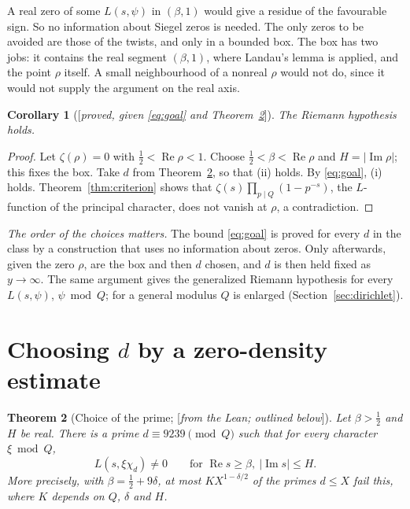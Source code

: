 \documentclass[11pt]{amsart}
\numberwithin{equation}{section}
\newtheorem{theorem}{Theorem}[section]
\newtheorem{corollary}[theorem]{Corollary}
\theoremstyle{definition}
\theoremstyle{remark}
\newcommand{\re}{\operatorname{Re}}
\newcommand{\im}{\operatorname{Im}}
\newcommand{\status}[1]{\textup{[\emph{#1}]}}
\begin{document}
A real zero of some $L(s,\psi)$ in $(\beta,1)$ would give a residue of the favourable sign. So no information about Siegel zeros is needed. The only zeros to be avoided are those of the twists, and only in a bounded box. The box has two jobs: it contains the real segment $(\beta,1)$, where Landau's lemma is applied, and the point $\rho$ itself. A small neighbourhood of a nonreal $\rho$ would not do, since it would not supply the argument on the real axis.

\begin{corollary}[\status{proved, given \eqref{eq:goal} and Theorem~\ref{thm:choice}}]
The Riemann hypothesis holds.
\end{corollary}
\begin{proof}
Let $\zeta(\rho)=0$ with $\frac12<\re\rho<1$. Choose $\frac12<\beta<\re\rho$ and $H=|\im\rho|$; this fixes the box. Take $d$ from Theorem~\ref{thm:choice}, so that (ii) holds. By \eqref{eq:goal}, (i) holds. Theorem~\ref{thm:criterion} shows that $\zeta(s)\prod_{p\mid Q}(1-p^{-s})$, the $L$-function of the principal character, does not vanish at $\rho$, a contradiction.
\end{proof}

\emph{The order of the choices matters.} The bound \eqref{eq:goal} is proved for every $d$ in the class by a construction that uses no information about zeros. Only afterwards, given the zero $\rho$, are the box and then $d$ chosen, and $d$ is then held fixed as $y\to\infty$. The same argument gives the generalized Riemann hypothesis for every $L(s,\psi)$, $\psi\bmod Q$; for a general modulus $Q$ is enlarged (Section~\ref{sec:dirichlet}).

\section{Choosing $d$ by a zero-density estimate}\label{sec:density}

\begin{theorem}[Choice of the prime; \status{from the Lean; outlined below}]\label{thm:choice}
Let $\beta>\frac12$ and $H$ be real. There is a prime $d\equiv9239\pmod Q$ such that for every character $\xi\bmod Q$,
\begin{equation}
 L(s,\xi\chi_d)\ne0\qquad\text{for }\re s\ge\beta,\ |\im s|\le H.
\end{equation}
More precisely, with $\beta=\frac12+9\delta$, at most $K X^{1-\delta/2}$ of the primes $d\le X$ fail this, where $K$ depends on $Q$, $\delta$ and $H$.
\end{theorem}
\end{document}
